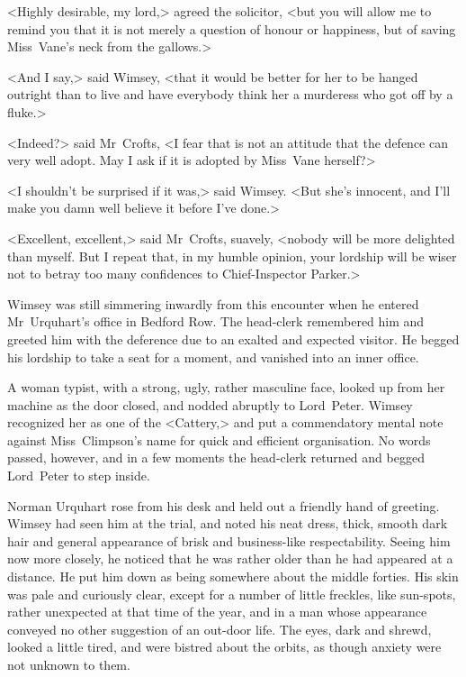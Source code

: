 <Highly desirable, my lord,> agreed the solicitor, <but you will allow me to remind you that it is not merely a question of honour or happiness, but of saving Miss~Vane's neck from the gallows.>

<And I say,> said Wimsey, <that it would be better for her to be hanged outright than to live and have everybody think her a murderess who got off by a fluke.>

<Indeed?> said Mr~Crofts, <I fear that is not an attitude that the defence can very well adopt. May I ask if it is adopted by Miss~Vane herself?>

<I shouldn't be surprised if it was,> said Wimsey. <But she's innocent, and I'll make you damn well believe it before I've done.>

<Excellent, excellent,> said Mr~Crofts, suavely, <nobody will be more delighted than myself. But I repeat that, in my humble opinion, your lordship will be wiser not to betray too many confidences to Chief-Inspector Parker.>

\divider

Wimsey was still simmering inwardly from this encounter when he entered Mr~Urquhart's office in Bedford Row. The head-clerk remembered him and greeted him with the deference due to an exalted and expected visitor. He begged his lordship to take a seat for a moment, and vanished into an inner office.

A woman typist, with a strong, ugly, rather masculine face, looked up from her machine as the door closed, and nodded abruptly to Lord~Peter. Wimsey recognized her as one of the <Cattery,> and put a commendatory mental note against Miss~Climpson's name for quick and efficient organisation. No words passed, however, and in a few moments the head-clerk returned and begged Lord~Peter to step inside.

Norman Urquhart rose from his desk and held out a friendly hand of greeting. Wimsey had seen him at the trial, and noted his neat dress, thick, smooth dark hair and general appearance of brisk and business-like respectability. Seeing him now more closely, he noticed that he was rather older than he had appeared at a distance. He put him down as being somewhere about the middle forties. His skin was pale and curiously clear, except for a number of little freckles, like sun-spots, rather unexpected at that time of the year, and in a man whose appearance conveyed no other suggestion of an out-door life. The eyes, dark and shrewd, looked a little tired, and were bistred about the orbits, as though anxiety were not unknown to them.

